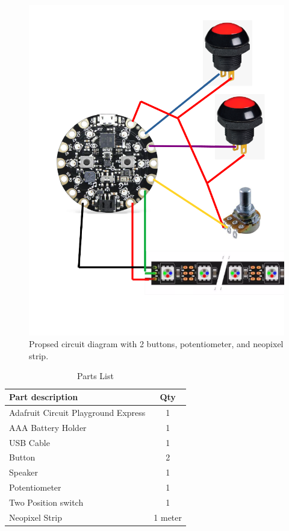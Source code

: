 \documentclass[12pt]{article}
\begin{document}
\begin{figure}[!t]
  \centering
  \includegraphics[width=4.5in]{Circuit_Diagram.png}
  \caption{Propsed circuit diagram with 2 buttons, potentiometer, and neopixel strip.}
  \label{fig:CircuitDiagram}
  \end{figure}


\begin{table}[ht]
  \caption{Parts List}
  \label{table:parts_list}
  \begin{center}
  \begin{tabular}{|p{3in}|c|}
  
  \hline
  Part description & Qty\\
  \hline
  \hline
  Adafruit Circuit Playground Express & 1 \\
  \hline
  AAA Battery Holder & 1 \\
  \hline
  USB Cable & 1 \\
  \hline
  Button & 2 \\
  \hline
  Speaker & 1 \\
  \hline
  Potentiometer & 1 \\
  \hline
  Two Position switch & 1 \\
  \hline
  Neopixel Strip & 1 meter \\
  \hline
  \end{tabular}
  \end{center}
  \end{table}
\end{document}
